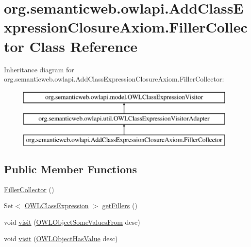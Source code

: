 \hypertarget{classorg_1_1semanticweb_1_1owlapi_1_1_add_class_expression_closure_axiom_1_1_filler_collector}{\section{org.\-semanticweb.\-owlapi.\-Add\-Class\-Expression\-Closure\-Axiom.\-Filler\-Collector Class Reference}
\label{classorg_1_1semanticweb_1_1owlapi_1_1_add_class_expression_closure_axiom_1_1_filler_collector}
}
Inheritance diagram for org.\-semanticweb.\-owlapi.\-Add\-Class\-Expression\-Closure\-Axiom.\-Filler\-Collector\-:\begin{figure}[H]
\begin{center}
\leavevmode
\includegraphics[height=3.000000cm]{classorg_1_1semanticweb_1_1owlapi_1_1_add_class_expression_closure_axiom_1_1_filler_collector}
\end{center}
\end{figure}
\subsection*{Public Member Functions}
\begin{DoxyCompactItemize}
\item 
\hyperlink{classorg_1_1semanticweb_1_1owlapi_1_1_add_class_expression_closure_axiom_1_1_filler_collector_ad0b82007862f69ea527ab59dacfb054c}{Filler\-Collector} ()
\item 
Set$<$ \hyperlink{interfaceorg_1_1semanticweb_1_1owlapi_1_1model_1_1_o_w_l_class_expression}{O\-W\-L\-Class\-Expression} $>$ \hyperlink{classorg_1_1semanticweb_1_1owlapi_1_1_add_class_expression_closure_axiom_1_1_filler_collector_a261dd762bb8719953102af74b07d53fa}{get\-Fillers} ()
\item 
void \hyperlink{classorg_1_1semanticweb_1_1owlapi_1_1_add_class_expression_closure_axiom_1_1_filler_collector_ab8fe416672b0db6cd15fc3a24933af7c}{visit} (\hyperlink{interfaceorg_1_1semanticweb_1_1owlapi_1_1model_1_1_o_w_l_object_some_values_from}{O\-W\-L\-Object\-Some\-Values\-From} desc)
\item 
void \hyperlink{classorg_1_1semanticweb_1_1owlapi_1_1_add_class_expression_closure_axiom_1_1_filler_collector_a3240f43c03b2cb6bbd7a47b851d5b268}{visit} (\hyperlink{interfaceorg_1_1semanticweb_1_1owlapi_1_1model_1_1_o_w_l_object_has_value}{O\-W\-L\-Object\-Has\-Value} desc)
\end{DoxyCompactItemize}
